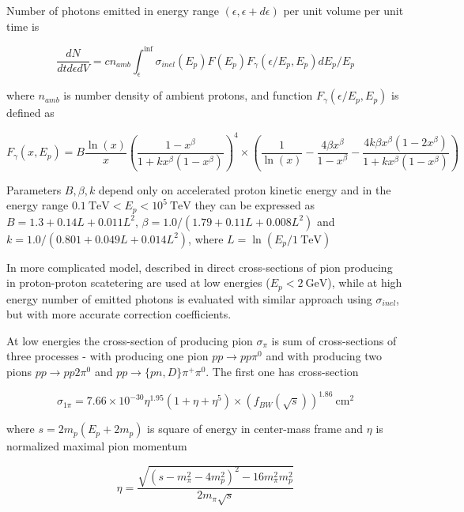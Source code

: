 Number of photons emitted in energy range $\left(\epsilon, \epsilon+d\epsilon\right)$ per unit volume per unit time is

\begin{equation}
	\frac{dN}{dt d\epsilon dV} = c n_{amb} \int_{\epsilon}^{\inf}\sigma_{inel}(E_p)F(E_p)F_{\gamma}(\epsilon/E_p, E_p) dE_p/E_p
\end{equation} 

where $n_{amb}$ is number density of ambient protons, and function $F_{\gamma}(\epsilon/E_p, E_p)$ is defined as

\begin{equation}
	F_{\gamma}(x, E_p) = B \frac{\ln(x)}{x} \left(\frac{1-x^\beta}{1+k x^{\beta}\left(1-x^\beta\right)}\right)^4\times\left(\frac{1}{\ln(x)}-\frac{4\beta x^\beta}{1-x^\beta}-\frac{4 k\beta x^\beta\left(1-2x^\beta\right)}{1+k x^\beta\left(1-x^\beta\right)}\right)
\end{equation}

Parameters $B, \beta, k$ depend only on accelerated proton kinetic energy and in the energy range $0.1~\text{TeV} < E_p < 10^5~\text{TeV}$ they can be expressed as $B = 1.3 + 0.14 L + 0.011 L^2$, $\beta = 1.0/\left(1.79 + 0.11 L  + 0.008 L^2\right)$ and $k = 1.0/\left(0.801 + 0.049 L + 0.014 L^2\right)$, where $L = \ln\left(E_p/1~\text{TeV}\right)$

In more complicated model, described in \cite{Kafexhiu} direct cross-sections of pion producing in proton-proton scatetering are used at low energies ($E_p < 2~\text{GeV}$), while at high energy number of emitted photons is evaluated with similar approach using $\sigma_{inel}$, but with more accurate correction coefficients.

At low energies the cross-section of producing pion $\sigma_{\pi}$ is sum of cross-sections of three processes - with producing one pion $pp\rightarrow pp\pi^0$ and with producing two pions $pp\rightarrow pp2\pi^0$ and $pp\rightarrow \{pn,D\}\pi^{+}\pi^0$. The first one has cross-section

\begin{equation}
	\sigma_{1\pi} = 7.66\times10^{-30}\eta^{1.95}\left(1 + \eta + \eta^5\right)\times\left(f_{BW}\left(\sqrt s\right)\right)^{1.86}~\text{cm}^{2}
\end{equation}

where $s = 2 m_p \left(E_p+2m_p\right)$ is square of energy in center-mass frame and $\eta$ is normalized maximal pion momentum

\begin{equation}
	\eta = \frac{\sqrt{\left(s-m_{\pi}^2-4m_p^2\right)^2-16 m_{\pi}^2m_p^2}}{2m_{\pi}\sqrt{s}}
\end{equation}

